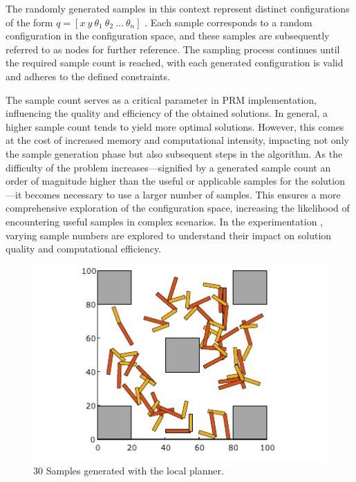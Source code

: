 \documentclass{IEEEtaes}
\begin{document}
The randomly generated samples in this context represent distinct configurations of the form $q = [ x \ y \ \theta_1 \ \theta_2 \ ... \ \theta_n ]$ . Each sample corresponds to a random configuration in the configuration space, and these samples are subsequently referred to as nodes for further reference. The sampling process continues until the required sample count is reached, with each generated configuration is valid and adheres to the defined constraints. 

The sample count serves as a critical parameter in PRM implementation, influencing the quality and efficiency of the obtained solutions. In general, a higher sample count tends to yield more optimal solutions. However, this comes at the cost of increased memory and computational intensity, impacting not only the sample generation phase but also subsequent steps in the algorithm. As the difficulty of the problem increases—signified by a generated sample count an order of magnitude higher than the useful or applicable samples for the solution—it becomes necessary to use a larger number of samples. This ensures a more comprehensive exploration of the configuration space, increasing the likelihood of encountering useful samples in complex scenarios. In the experimentation , varying sample numbers are explored to understand their impact on solution quality and computational efficiency.

\begin{figure}[t]
    \begin{center}
        \includegraphics[width=0.9\linewidth]{figures/LOCALPLANNER.pdf}
     \end{center}
     \vspace{-1.5em}
     \caption{30 Samples generated with the local planner.}
     \label{samples}
     \vspace{-1em}
\end{figure}
\end{document}
